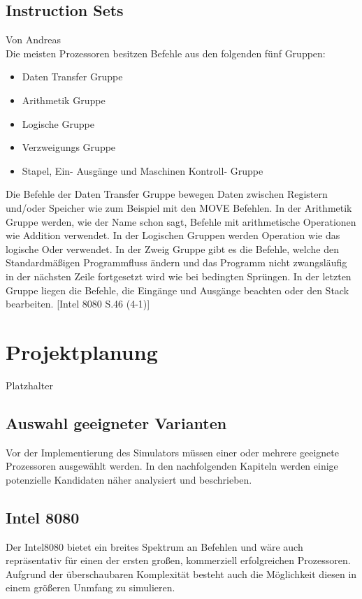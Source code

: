 \documentclass[12pt]{article}
\begin{document}
\subsection{Instruction Sets}
Von Andreas\\
Die meisten Prozessoren besitzen Befehle aus den folgenden fünf Gruppen:
\begin{itemize}
\item Daten Transfer Gruppe
\item Arithmetik Gruppe
\item Logische Gruppe
\item Verzweigungs Gruppe
\item Stapel, Ein- Ausgänge und Maschinen Kontroll- Gruppe
\end{itemize}\noindent
Die Befehle der Daten Transfer Gruppe bewegen Daten zwischen Registern und/oder Speicher wie zum Beispiel mit den MOVE Befehlen. In der Arithmetik Gruppe werden, wie der Name schon sagt, Befehle mit arithmetische Operationen wie Addition verwendet. In der Logischen Gruppen werden Operation wie das logische Oder verwendet. In der Zweig Gruppe gibt es die Befehle, welche den Standardmäßigen Programmfluss ändern und das Programm nicht zwangsläufig in der nächsten Zeile fortgesetzt wird wie bei bedingten Sprüngen. In der letzten Gruppe liegen die Befehle, die Eingänge und Ausgänge beachten oder den Stack bearbeiten. [Intel 8080 S.46 (4-1)]
\\

\newpage

\section{Projektplanung}
Platzhalter

\subsection{Auswahl geeigneter Varianten}
Vor der Implementierung des Simulators müssen einer oder mehrere geeignete Prozessoren ausgewählt werden. In den nachfolgenden Kapiteln werden einige potenzielle Kandidaten näher analysiert und beschrieben.

\subsection{Intel 8080}
Der Intel8080 bietet ein breites Spektrum an Befehlen und wäre auch repräsentativ für einen der ersten großen, kommerziell erfolgreichen Prozessoren. Aufgrund der überschaubaren Komplexität besteht auch die Möglichkeit diesen in einem größeren Unmfang zu simulieren.
\end{document}
